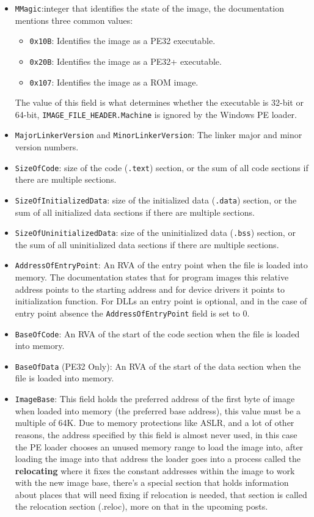 \begin{itemize}

    \item \verb+MMagic+:integer that identifies the state of the image, the documentation mentions three common values:
        \begin{itemize}

            \item \verb+0x10B+: Identifies the image as a PE32 executable.
            \item \verb+0x20B+: Identifies the image as a PE32+ executable.
            \item \verb+0x107+: Identifies the image as a ROM image.
        \end{itemize}
    The value of this field is what determines whether the executable is 32-bit or 64-bit, \verb+IMAGE_FILE_HEADER.Machine+ is ignored by the Windows PE loader.
    \item \verb+MajorLinkerVersion+ and \verb+MinorLinkerVersion+: The linker major and minor version numbers.
    \item \verb+SizeOfCode+: size of the code (\verb+.text+) section, or the sum of all code sections if there are multiple sections.
    \item \verb+SizeOfInitializedData+: size of the initialized data (\verb+.data+) section, or the sum of all initialized data sections if there are multiple sections.
    \item \verb+SizeOfUninitializedData+: size of the uninitialized data (\verb+.bss+) section, or the sum of all uninitialized data sections if there are multiple sections.
    \item \verb+AddressOfEntryPoint+: An RVA of the entry point when the file is loaded into memory. The documentation states that for program images this relative address points to the starting address and for device drivers it points to initialization function. For DLLs an entry point is optional, and in the case of entry point absence the \verb+AddressOfEntryPoint+ field is set to 0.
    \item \verb+BaseOfCode+: An RVA of the start of the code section when the file is loaded into memory.
    \item \verb+BaseOfData+ (PE32 Only): An RVA of the start of the data section when the file is loaded into memory.
    \item \verb+ImageBase+: This field holds the preferred address of the first byte of image when loaded into memory (the preferred base address), this value must be a multiple of 64K. Due to memory protections like ASLR, and a lot of other reasons, the address specified by this field is almost never used, in this case the PE loader chooses an unused memory range to load the image into, after loading the image into that address the loader goes into a process called the {\bf relocating} where it fixes the constant addresses within the image to work with the new image base, there’s a special section that holds information about places that will need fixing if relocation is needed, that section is called the relocation section (.reloc), more on that in the upcoming posts.

\end{itemize}
